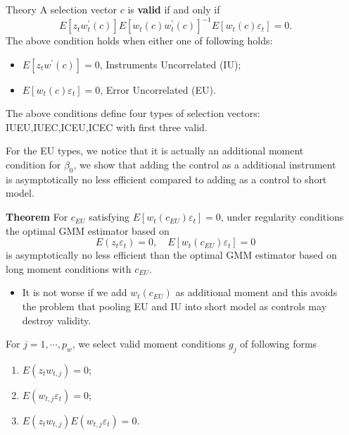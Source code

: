 \documentclass[final]{beamer}
\newlength{\sepwidth}
\newlength{\colwidth}
\newcommand{\separatorcolumn}{\begin{column}{\sepwidth}\end{column}}
\begin{document}
\begin{frame}[t]
\begin{columns}[t]
\begin{column}{\colwidth}
\begin{block}{Theory}
    A selection vector $c$  is \textbf{valid} if and only if 
    $$
    E\left[z_{t}w_{t}^{\prime}(c)\right]E\left[w_{t}(c)w_{t}^{\prime}(c)\right]^{-1}E\left[w_{t}(c)\varepsilon_{t}\right] = 0.
    $$
    The above condition holds when either one of following holds:
    \begin{itemize}[label = \bullet]
        \item $E\left[z_{t}w^{\prime}(c)\right]=0$, Instruments Uncorrelated (IU);
        \item $E\left[w_{t}(c)\varepsilon_{t}\right]=0$, Error Uncorrelated (EU).
    \end{itemize}
    The above conditions define four types of  selection vectors: IUEU,IUEC,ICEU,ICEC with first three valid. 

    For the EU types, we notice that it is actually an additional moment condition for $\beta_0$, we show that adding the control as a additional instrument is asymptotically no less efficient compared to adding as a control to short model.

    \textbf{Theorem} For $c_{EU}$ satisfying $E\left[w_{t}(c_{EU})\varepsilon_{t}\right]=0$, under regularity conditions the optimal GMM estimator based on 
    $$
        E(z_t \varepsilon_t) = 0,\quad E\left[w_{t}(c_{EU})\varepsilon_{t}\right]=0
    $$
    is asymptotically no less efficient than the optimal GMM estimator based on long moment conditions with $c_{EU}$.
    \begin{itemize}[label = \triangle]
        \item It is not worse if we add $w_{t}(c_{EU})$ as additional moment and this avoids the problem that pooling EU and IU into short model as controls may destroy validity.
    \end{itemize}

        For $j=1,\cdots,p_w$, we select valid moment conditions $g_j$ of following forms
         \begin{enumerate}[label=(\roman*)]
             \item $E(z_t w_{t,j})=0$;
             \item $E(w_{t,j}\varepsilon_t)=0$;
             \item $E(z_t w_{t,j})E(w_{t,j}\varepsilon_t)=0$.
         \end{enumerate}
    \end{block}
\end{column}

\separatorcolumn


\end{columns}
\end{frame}
\end{document}
